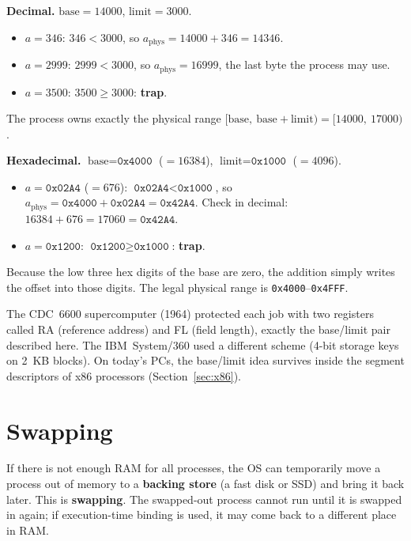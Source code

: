 \documentclass[11pt,a4paper]{article}
\newcommand{\term}[1]{\textbf{\color{mintdeep}#1}}
\begin{document}
\begin{example}
\textbf{Decimal.} $\text{base} = 14000$, $\text{limit} = 3000$.
\begin{itemize}
  \item $a = 346$: $346 < 3000$, so $a_{\text{phys}} = 14000 + 346 = 14346$.
  \item $a = 2999$: $2999 < 3000$, so $a_{\text{phys}} = 16999$, the last byte the process may use.
  \item $a = 3500$: $3500 \ge 3000$: \textbf{trap}.
\end{itemize}
The process owns exactly the physical range $[\text{base},\ \text{base}+\text{limit}) = [14000,\ 17000)$.

\textbf{Hexadecimal.} $\text{base} = \texttt{0x4000}$ ($=16384$), $\text{limit} = \texttt{0x1000}$ ($=4096$).
\begin{itemize}
  \item $a = \texttt{0x02A4}$ ($=676$): $\texttt{0x02A4} < \texttt{0x1000}$, so $a_{\text{phys}} = \texttt{0x4000} + \texttt{0x02A4} = \texttt{0x42A4}$. Check in decimal: $16384 + 676 = 17060 = \texttt{0x42A4}$.
  \item $a = \texttt{0x1200}$: $\texttt{0x1200} \ge \texttt{0x1000}$: \textbf{trap}.
\end{itemize}
Because the low three hex digits of the base are zero, the addition simply writes the offset into those digits. The legal physical range is \texttt{0x4000}--\texttt{0x4FFF}.
\end{example}

\begin{histnote}
The CDC~6600 supercomputer (1964) protected each job with two registers called RA (reference address) and FL (field length), exactly the base/limit pair described here. The IBM~System/360 used a different scheme (4-bit storage keys on 2~KB blocks). On today's PCs, the base/limit idea survives inside the segment descriptors of x86 processors (Section~\ref{sec:x86}).
\end{histnote}

\section{Swapping}

If there is not enough RAM for all processes, the OS can temporarily move a process out of memory to a \term{backing store} (a fast disk or SSD) and bring it back later. This is \term{swapping}. The swapped-out process cannot run until it is swapped in again; if execution-time binding is used, it may come back to a different place in RAM.
\end{document}
